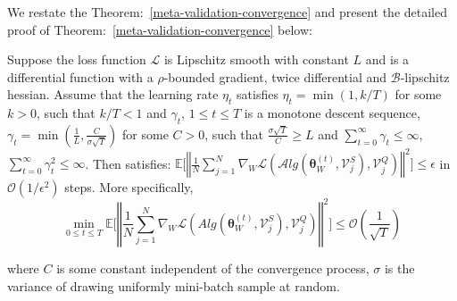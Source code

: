 We restate the Theorem:~\ref{meta-validation-convergence} and present the detailed proof of Theorem:~\ref{meta-validation-convergence} below:
\begin{theorem*}
Suppose the loss function $\mathcal{L}$ is Lipschitz smooth with constant $L$ and is a differential function with a $\rho$-bounded gradient, twice differential and $\mathcal{B}$-lipschitz hessian. Assume that the learning rate $\eta_t$ satisfies $\eta_t = \min{(1, k/T)}$ for some $k>0$, such that $k/T < 1$ and $\gamma_t$, $1 \leq t \leq T$ is a monotone descent sequence, $\gamma_t = \min{(\frac{1}{L}, \frac{C}{\sigma \sqrt{T}})}$ for some $C > 0$, such that $\frac{\sigma\sqrt{T}}{C} \geq L$ and $\sum_{t = 0}^{\infty}\gamma_t \leq \infty$, $\sum_{t = 0}^{\infty}\gamma_t^2 \leq \infty$. Then \sysname{} satisfies: $\mathbb{E}\Bigg[\left\Vert\frac{1}{N}\sum_{j=1}^{N}\nabla_W\mathcal{L}(\mathcal{A}{lg}(\boldsymbol{\theta}_W^{(t)}, \mathcal{V}_j^S), \mathcal{V}_j^Q)\right\Vert^2\Bigg] \leq \epsilon$ in $\mathcal{O}(1/ \epsilon^2)$ steps. More specifically,
\begin{equation}
\underset{0 \leq t \le T}{\min}\mathbb{E}\Bigg[\left\Vert\frac{1}{N}\sum_{j=1}^{N}\nabla_W\mathcal{L}(\textit{Alg}(\boldsymbol{\theta}_W^{(t)}, \mathcal{V}_j^S), \mathcal{V}_j^Q)\right\Vert^2\Bigg] \leq \mathcal{O}(\frac{1}{\sqrt{T}})
\end{equation}

where $C$ is some constant independent of the convergence process, $\sigma$ is the variance of drawing uniformly mini-batch sample at random.
\end{theorem*}

